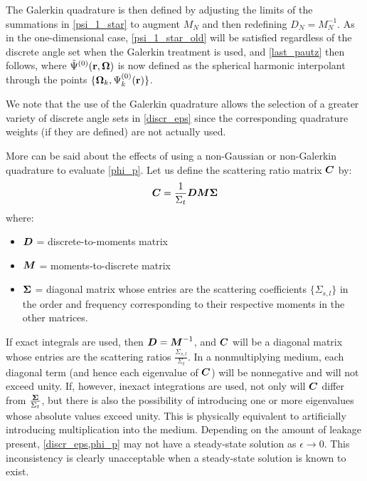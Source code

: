 The Galerkin quadrature is then defined by adjusting the limits of the
summations in \cref{psi_1_star} to augment $M_N$ and then redefining
$D_N=M_N^{-1}$. As in the one-dimensional case, \cref{psi_1_star_old} will be 
satisfied regardless of the discrete angle set when the Galerkin treatment is 
used, and \cref{last_pautz} then follows, where $\tilde{\Psi}^{(0)}(\mathbf{r},\boldsymbol{\Omega})$ 
is now defined as the spherical harmonic interpolant through the points 
$\{\boldsymbol{\Omega}_k,\Psi_k^{(0)}(\mathbf{r})\}$.

We note that the use of the Galerkin quadrature allows the selection of a
greater variety of discrete angle sets in \cref{discr_eps} since the
corresponding quadrature weights (if they are defined) are not actually used.

More can be said about the effects of using a non-Gaussian or non-Galerkin
quadrature to evaluate \cref{phi_p}. Let us define the scattering
ratio matrix $\boldsymbol{C}$ by:
\begin{equation}
\boldsymbol{C} = \frac{1}{\Sigma_t}\boldsymbol{D}\boldsymbol{M}\boldsymbol{\Sigma}
\end{equation}
where:
\begin{itemize}
\item $\boldsymbol{D}$ = discrete-to-moments matrix
\item $\boldsymbol{M}$ = moments-to-discrete matrix
\item $\boldsymbol{\Sigma}$ = diagonal matrix whose entries are the scattering
coefficients $\{\Sigma_{s,l}\}$ in the order and frequency corresponding to
their respective moments in the other matrices.
\end{itemize}
If exact integrals are used, then $\boldsymbol{D}=\boldsymbol{M}^{-1}$, and $\boldsymbol{C}$ will be a
diagonal matrix whose entries are the scattering ratios
$\frac{\Sigma_{s,l}}{\Sigma_t}$. In a nonmultiplying medium, each diagonal
term (and hence each eigenvalue of $\boldsymbol{C}$) will be nonnegative and will not
exceed unity. If, however, inexact integrations are used, not only will
$\boldsymbol{C}$ differ from $\frac{\boldsymbol{\Sigma}}{\Sigma_t}$, but there is also the
possibility of introducing one or more eigenvalues whose absolute values
exceed unity. This is physically equivalent to artificially introducing
multiplication into the medium. Depending on the amount of leakage present,
\cref{discr_eps,phi_p} may not have a steady-state
solution as $\epsilon\rightarrow 0$. This inconsistency is clearly
unacceptable when a steady-state solution is known to exist.

